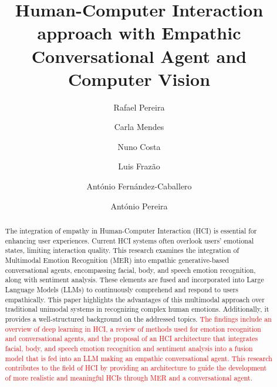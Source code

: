 \documentclass[runningheads]{llncs}
\begin{document}
%
\title{Human-Computer Interaction approach with Empathic Conversational Agent and Computer Vision}
%
%
\author{Rafael Pereira \and
Carla Mendes \and
Nuno Costa \and
Luis Frazão \and
António Fernández-Caballero \and
António Pereira}
%
%

%
\maketitle              %
%
\begin{abstract}

The integration of empathy in Human-Computer Interaction (HCI) is essential for enhancing user experiences. Current HCI systems often overlook users' emotional states, limiting interaction quality. This research examines the integration of Multimodal Emotion Recognition (MER) into empathic generative-based conversational agents, encompassing facial, body, and speech emotion recognition, along with sentiment analysis. These elements are fused and incorporated into Large Language Models (LLMs) to continuously comprehend and respond to users empathically. This paper highlights the advantages of this multimodal approach over traditional unimodal systems in recognizing complex human emotions. Additionally, it provides a well-structured background on the addressed topics. \textcolor{red}{The findings include an overview of deep learning in HCI, a review of methods used for emotion recognition and conversational agents, and the proposal of an HCI architecture that integrates facial, body, and speech emotion recognition and sentiment analysis into a fusion model that is fed into an LLM making an empathic conversational agent. This research contributes to the field of HCI by providing an architecture to guide the development of more realistic and meaningful HCIs through MER and a conversational agent.}

\end{abstract}
%
%
%
\end{document}
